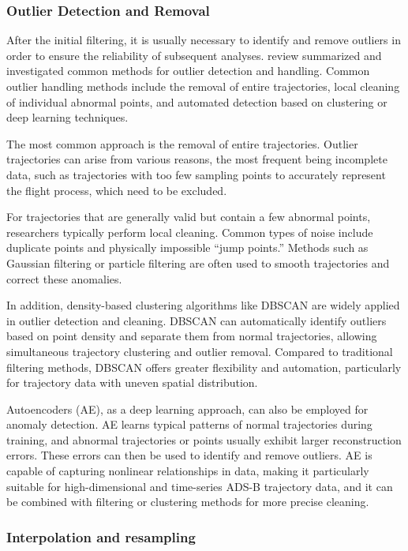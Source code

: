 \subsubsection{Outlier Detection and Removal} 

After the initial filtering, it is usually necessary to identify and remove outliers in order to ensure the reliability of subsequent analyses. \cite{olive2024filtering} review summarized and investigated common methods for outlier detection and handling. Common outlier handling methods include the removal of entire trajectories, local cleaning of individual abnormal points, and automated detection based on clustering or deep learning techniques.

The most common approach is the removal of entire trajectories. Outlier trajectories can arise from various reasons, the most frequent being incomplete data, such as trajectories with too few sampling points to accurately represent the flight process, which need to be excluded.

For trajectories that are generally valid but contain a few abnormal points, researchers typically perform local cleaning. Common types of noise include duplicate points and physically impossible “jump points.” Methods such as Gaussian filtering or particle filtering are often used to smooth trajectories and correct these anomalies.

In addition, density-based clustering algorithms like DBSCAN are widely applied in outlier detection and cleaning. DBSCAN can automatically identify outliers based on point density and separate them from normal trajectories, allowing simultaneous trajectory clustering and outlier removal. Compared to traditional filtering methods, DBSCAN offers greater flexibility and automation, particularly for trajectory data with uneven spatial distribution.

Autoencoders (AE), as a deep learning approach, can also be employed for anomaly detection. AE learns typical patterns of normal trajectories during training, and abnormal trajectories or points usually exhibit larger reconstruction errors. These errors can then be used to identify and remove outliers. AE is capable of capturing nonlinear relationships in data, making it particularly suitable for high-dimensional and time-series ADS-B trajectory data, and it can be combined with filtering or clustering methods for more precise cleaning.


\subsubsection{Interpolation and resampling} 

